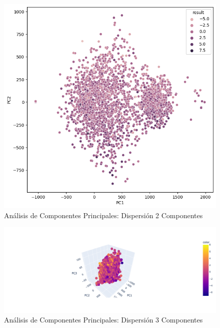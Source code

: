 \begin{figure}[H]
    \centering
    \includegraphics[width=\figsize]{images/scatterPlotPCA2.png}
    \caption{Análisis de Componentes Principales: Dispersión 2 Componentes}
    \label{Conjunto-Datos-Scatter-Plot-2}
\end{figure}

\begin{figure}[H]
    \centering
    \includegraphics[width=\figsize]{images/scatterPlotPCA3.png}
    \caption{Análisis de Componentes Principales: Dispersión 3 Componentes}
    \label{Conjunto-Datos-Scatter-Plot-3}
\end{figure}